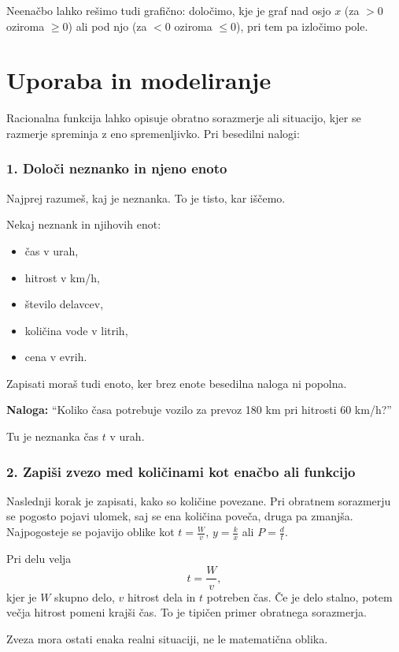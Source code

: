 \documentclass[11pt]{article}
\begin{document}
Neenačbo lahko rešimo tudi grafično: določimo, kje je graf nad osjo $x$ (za $>0$ oziroma $\ge 0$) ali pod njo (za $<0$ oziroma $\le 0$), pri tem pa izločimo pole.

\section{Uporaba in modeliranje}

Racionalna funkcija lahko opisuje obratno sorazmerje ali situacijo, kjer se razmerje spreminja z eno spremenljivko. Pri besedilni nalogi:

\subsubsection*{1. Določi neznanko in njeno enoto}
Najprej razumeš, kaj je neznanka. To je tisto, kar iščemo.

\begin{primerbox}
Nekaj neznank in njihovih enot:
\begin{itemize}[leftmargin=*]
  \item čas v urah,
  \item hitrost v km/h,
  \item število delavcev,
  \item količina vode v litrih,
  \item cena v evrih.
\end{itemize}
Zapisati moraš tudi enoto, ker brez enote besedilna naloga ni popolna.

\textbf{Naloga:} “Koliko časa potrebuje vozilo za prevoz 180 km pri hitrosti 60 km/h?”

Tu je neznanka čas $t$ v urah.
\end{primerbox}

\subsubsection*{2. Zapiši zvezo med količinami kot enačbo ali funkcijo}
Naslednji korak je zapisati, kako so količine povezane. Pri obratnem sorazmerju se pogosto pojavi ulomek, saj se ena količina poveča, druga pa zmanjša. Najpogosteje se pojavijo oblike kot $t=\frac{W}{v}$, $y=\frac{k}{x}$ ali $P=\frac{d}{t}$.

\begin{primerbox}
Pri delu velja
\[
 t=\frac{W}{v},
\]
kjer je $W$ skupno delo, $v$ hitrost dela in $t$ potreben čas. Če je delo stalno, potem večja hitrost pomeni krajši čas. To je tipičen primer obratnega sorazmerja.

Zveza mora ostati enaka realni situaciji, ne le matematična oblika.
\end{primerbox}
\end{document}
